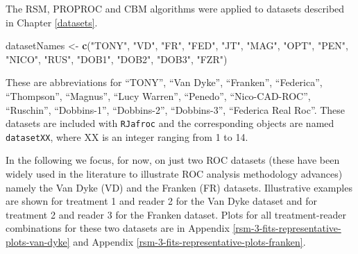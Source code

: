 \documentclass[
]{book}
\newenvironment{Shaded}{\begin{snugshade}}{\end{snugshade}}
\newcommand{\CommentTok}[1]{\textcolor[rgb]{0.56,0.35,0.01}{\textit{#1}}}
\newcommand{\KeywordTok}[1]{\textcolor[rgb]{0.13,0.29,0.53}{\textbf{#1}}}
\newcommand{\NormalTok}[1]{#1}
\newcommand{\OperatorTok}[1]{\textcolor[rgb]{0.81,0.36,0.00}{\textbf{#1}}}
\newcommand{\StringTok}[1]{\textcolor[rgb]{0.31,0.60,0.02}{#1}}
\begin{document}
The RSM, PROPROC and CBM algorithms were applied to datasets described in Chapter \ref{datasets}.

\begin{Shaded}
\begin{Highlighting}[]
\NormalTok{datasetNames <-}\StringTok{  }
\StringTok{  }\KeywordTok{c}\NormalTok{(}\StringTok{"TONY"}\NormalTok{, }\StringTok{"VD"}\NormalTok{, }\StringTok{"FR"}\NormalTok{, }
  \StringTok{"FED"}\NormalTok{, }\StringTok{"JT"}\NormalTok{, }\StringTok{"MAG"}\NormalTok{, }
  \StringTok{"OPT"}\NormalTok{, }\StringTok{"PEN"}\NormalTok{, }\StringTok{"NICO"}\NormalTok{,}
  \StringTok{"RUS"}\NormalTok{, }\StringTok{"DOB1"}\NormalTok{, }\StringTok{"DOB2"}\NormalTok{, }
  \StringTok{"DOB3"}\NormalTok{, }\StringTok{"FZR"}\NormalTok{)}
\end{Highlighting}
\end{Shaded}

These are abbreviations for ``TONY'', ``Van Dyke'', ``Franken'', ``Federica'', ``Thompson'', ``Magnus'', ``Lucy Warren'', ``Penedo'', ``Nico-CAD-ROC'', ``Ruschin'', ``Dobbins-1'', ``Dobbins-2'', ``Dobbins-3'', ``Federica Real Roc''. These datasets are included with \texttt{RJafroc} and the corresponding objects are named \texttt{datasetXX}, where XX is an integer ranging from 1 to 14.

In the following we focus, for now, on just two ROC datasets (these have been widely used in the literature to illustrate ROC analysis methodology advances) namely the Van Dyke (VD) and the Franken (FR) datasets. Illustrative examples are shown for treatment 1 and reader 2 for the Van Dyke dataset and for treatment 2 and reader 3 for the Franken dataset. Plots for all treatment-reader combinations for these two datasets are in Appendix \ref{rsm-3-fits-representative-plots-van-dyke} and Appendix \ref{rsm-3-fits-representative-plots-franken}.

\begin{Shaded}
\end{Shaded}
\end{document}

